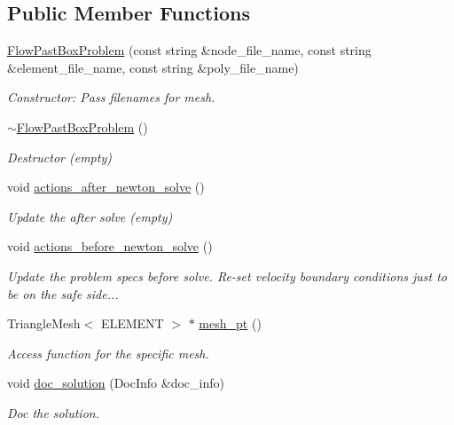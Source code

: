 \subsection*{Public Member Functions}
\begin{DoxyCompactItemize}
\item 
\hyperlink{classFlowPastBoxProblem_a6b674c1028abcd6e54c50d939d25a00e}{Flow\+Past\+Box\+Problem} (const string \&node\+\_\+file\+\_\+name, const string \&element\+\_\+file\+\_\+name, const string \&poly\+\_\+file\+\_\+name)
\begin{DoxyCompactList}\small\item\em Constructor\+: Pass filenames for mesh. \end{DoxyCompactList}\item 
\hyperlink{classFlowPastBoxProblem_a48bb150799924e3d0ab42a610babefbd}{$\sim$\+Flow\+Past\+Box\+Problem} ()
\begin{DoxyCompactList}\small\item\em Destructor (empty) \end{DoxyCompactList}\item 
void \hyperlink{classFlowPastBoxProblem_a5d226368814cfbf84f274a63b3c0b20c}{actions\+\_\+after\+\_\+newton\+\_\+solve} ()
\begin{DoxyCompactList}\small\item\em Update the after solve (empty) \end{DoxyCompactList}\item 
void \hyperlink{classFlowPastBoxProblem_a602772b5e37d5bd426d64e46cc3f59ea}{actions\+\_\+before\+\_\+newton\+\_\+solve} ()
\begin{DoxyCompactList}\small\item\em Update the problem specs before solve. Re-\/set velocity boundary conditions just to be on the safe side... \end{DoxyCompactList}\item 
Triangle\+Mesh$<$ E\+L\+E\+M\+E\+NT $>$ $\ast$ \hyperlink{classFlowPastBoxProblem_a3efbee75a2cc6ca9d6ffd4ec0a3a2c52}{mesh\+\_\+pt} ()
\begin{DoxyCompactList}\small\item\em Access function for the specific mesh. \end{DoxyCompactList}\item 
void \hyperlink{classFlowPastBoxProblem_a7e2f3692ab8f492c6d5e967953c4a4ea}{doc\+\_\+solution} (Doc\+Info \&doc\+\_\+info)
\begin{DoxyCompactList}\small\item\em Doc the solution. \end{DoxyCompactList}\end{DoxyCompactItemize}


